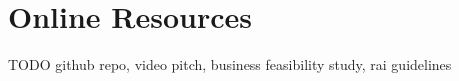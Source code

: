 \section{Online Resources}

TODO
github repo, video pitch, business feasibility study, rai guidelines
